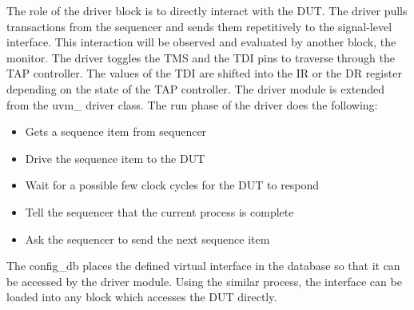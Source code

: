 \documentclass[a4paper,11pt]{article}
\begin{document}
The role of the driver block is to directly interact with the DUT. The driver pulls transactions from the sequencer and sends them repetitively to the signal-level interface. This interaction will be observed and evaluated by another block, the monitor. The driver toggles the TMS and the TDI pins to traverse through the TAP controller. The values of the TDI are shifted into the IR or the DR register depending on the state of the TAP controller. The driver module is extended from the uvm\_ driver class.
The run phase of the driver does the following:

\begin{itemize}[noitemsep]
\item Gets a sequence item from sequencer
\item Drive the sequence item to the DUT
\item Wait for a possible few clock cycles for the DUT to respond
\item Tell the sequencer that the current process is complete
\item Ask the sequencer to send the next sequence item
\end{itemize}

The config\_db places the defined virtual interface in the database so that it can be accessed by the driver module. Using the similar process, the interface can be loaded into any block which accesses the DUT directly.\\
\end{document}
